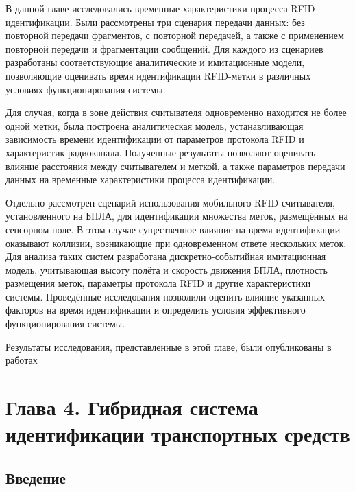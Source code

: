 \documentclass[12pt]{article}
\theoremstyle{definition}
\begin{document}
В данной главе исследовались временные характеристики процесса RFID-идентификации. Были рассмотрены три сценария передачи данных: без повторной передачи фрагментов, с повторной передачей, а также с применением повторной передачи и фрагментации сообщений. Для каждого из сценариев разработаны соответствующие аналитические и имитационные модели, позволяющие оценивать время идентификации RFID-метки в различных условиях функционирования системы.

Для случая, когда в зоне действия считывателя одновременно находится не более одной метки, была построена аналитическая модель, устанавливающая зависимость времени идентификации от параметров протокола RFID и характеристик радиоканала. Полученные результаты позволяют оценивать влияние расстояния между считывателем и меткой, а также параметров передачи данных на временные характеристики процесса идентификации.

Отдельно рассмотрен сценарий использования мобильного RFID-считывателя, установленного на БПЛА, для идентификации множества меток, размещённых на сенсорном поле. В этом случае существенное влияние на время идентификации оказывают коллизии, возникающие при одновременном ответе нескольких меток. Для анализа таких систем разработана дискретно-событийная имитационная модель, учитывающая высоту полёта и скорость движения БПЛА, плотность размещения меток, параметры протокола RFID и другие характеристики системы. Проведённые исследования позволили оценить влияние указанных факторов на время идентификации и определить условия эффективного функционирования системы.

Результаты исследования, представленные в этой главе, были опубликованы в работах \cite{Abramian2022, Abramian2024, Abramian2025}

\pagebreak


\section{Глава 4. Гибридная система идентификации транспортных средств}
\subsection{Введение}
\end{document}
